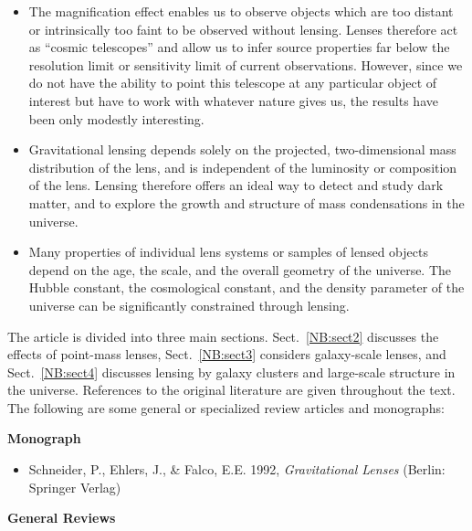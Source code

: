 \documentclass[a4paper,10pt]{article} %
\begin{document}
\begin{itemize}

\item[--] The magnification effect enables us to observe objects which
are too distant or intrinsically too faint to be observed without
lensing. Lenses therefore act as ``cosmic telescopes'' and allow us to
infer source properties far below the resolution limit or sensitivity
limit of current observations. However, since we do not have the
ability to point this telescope at any particular object of
interest but have to work with whatever nature gives us, the results
have been only modestly interesting.

\item[--] Gravitational lensing depends solely on the projected,
two-dimensional mass distribution of the lens, and is independent of
the luminosity or composition of the lens. Lensing therefore offers an
ideal way to detect and study dark matter, and to explore the growth
and structure of mass condensations in the universe.

\item[--] Many properties of individual lens systems or samples of
lensed objects depend on the age, the scale, and the overall geometry
of the universe. The Hubble constant, the cosmological constant, and
the density parameter of the universe can be significantly constrained
through lensing.
\end{itemize}

The article is divided into three main sections. Sect.\ \ref{NB:sect2}
discusses the effects of point-mass lenses, Sect.\ \ref{NB:sect3}
considers galaxy-scale lenses, and Sect.\ \ref{NB:sect4} discusses
lensing by galaxy clusters and large-scale structure in the
universe. References to the original literature are given throughout
the text. The following are some general or specialized review
articles and monographs:

\begin{center}
{\bf Monograph}
\end{center}

\begin{itemize}

\item[--] Schneider, P., Ehlers, J., \& Falco, E.E. 1992, {\em
Gravitational Lenses\/} (Berlin: Springer Verlag)

\end{itemize}

\begin{center}
{\bf General Reviews}
\end{center}
\end{document}
